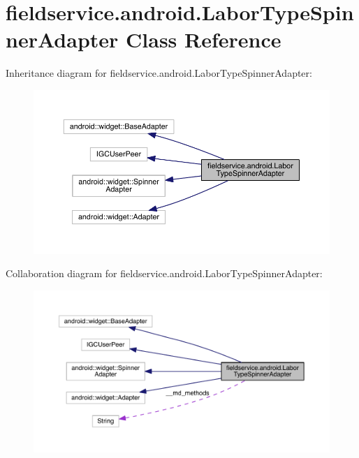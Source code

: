 \hypertarget{classfieldservice_1_1android_1_1_labor_type_spinner_adapter}{\section{fieldservice.\+android.\+Labor\+Type\+Spinner\+Adapter Class Reference}
\label{classfieldservice_1_1android_1_1_labor_type_spinner_adapter}
}


Inheritance diagram for fieldservice.\+android.\+Labor\+Type\+Spinner\+Adapter\+:
\nopagebreak
\begin{figure}[H]
\begin{center}
\leavevmode
\includegraphics[width=350pt]{classfieldservice_1_1android_1_1_labor_type_spinner_adapter__inherit__graph}
\end{center}
\end{figure}


Collaboration diagram for fieldservice.\+android.\+Labor\+Type\+Spinner\+Adapter\+:
\nopagebreak
\begin{figure}[H]
\begin{center}
\leavevmode
\includegraphics[width=350pt]{classfieldservice_1_1android_1_1_labor_type_spinner_adapter__coll__graph}
\end{center}
\end{figure}
